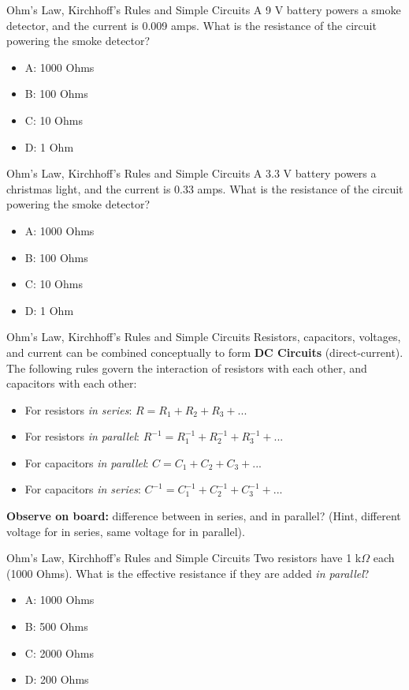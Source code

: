 \documentclass{beamer}
\begin{document}
\begin{frame}{Ohm's Law, Kirchhoff's Rules and Simple Circuits}
A 9 V battery powers a smoke detector, and the current is 0.009 amps.  What is the resistance of the circuit powering the smoke detector?
\begin{itemize}
\item A: 1000 Ohms
\item B: 100 Ohms
\item C: 10 Ohms
\item D: 1 Ohm
\end{itemize}
\end{frame}

\begin{frame}{Ohm's Law, Kirchhoff's Rules and Simple Circuits}
A 3.3 V battery powers a christmas light, and the current is 0.33 amps.  What is the resistance of the circuit powering the smoke detector?
\begin{itemize}
\item A: 1000 Ohms
\item B: 100 Ohms
\item C: 10 Ohms
\item D: 1 Ohm
\end{itemize}
\end{frame}

\begin{frame}{Ohm's Law, Kirchhoff's Rules and Simple Circuits}
Resistors, capacitors, voltages, and current can be combined conceptually to form \alert{\textbf{DC Circuits}} (direct-current).  The following rules govern the interaction of resistors with each other, and capacitors with each other:
\begin{itemize}
\item For resistors \textit{in series}: $R = R_1 + R_2 + R_3 + ...$
\item For resistors \textit{in parallel}: $R^{-1} = R_1^{-1} + R_2^{-1} + R_3^{-1} + ...$
\item For capacitors \textit{in parallel}: $C = C_1 + C_2 + C_3 + ...$
\item For capacitors \textit{in series}: $C^{-1} = C_1^{-1} + C_2^{-1} + C_3^{-1} + ...$
\end{itemize}
\textbf{Observe on board:} difference between in series, and in parallel? (Hint, different voltage for in series, same voltage for in parallel).
\end{frame}

\begin{frame}{Ohm's Law, Kirchhoff's Rules and Simple Circuits}
Two resistors have 1 k$\Omega$ each (1000 Ohms).  What is the effective resistance if they are added \textit{in parallel}?
\begin{itemize}
\item A: 1000 Ohms
\item B: 500 Ohms
\item C: 2000 Ohms
\item D: 200 Ohms
\end{itemize}
\end{frame}
\end{document}
